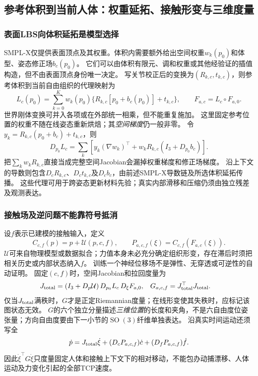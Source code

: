 \documentclass[11pt,a4paper]{article}
\numberwithin{equation}{section}
\theoremstyle{definition}
\DeclareMathOperator{\SO}{SO}
\begin{document}
\subsection{参考体积到当前人体：权重延拓、接触形变与三维度量}
\label{geo:sub:volume-transport}

\subsubsection{表面LBS向体积延拓是模型选择}
SMPL-X仅提供表面顶点及其权重。体积内需要额外给出空间权重$w_k(p_0)$和体型、姿态修正场$b_c(p_0)$。
它们可以由体积有限元、调和权重或其他经验证的插值构造，但不由表面顶点身份唯一决定。
写关节校正后的变换为$(R_{k,c},t_{k,c})$，则参考体积到当前自由组织的代理映射为
\begin{equation}
 L_c(p_0)=\sum_{k=0}^{K}w_k(p_0)
       \{R_{k,c}[p_0+b_c(p_0)]+t_{k,c}\},
 \qquad F_{a,c}=L_c\circ F_{a,0}.
 \label{geo:eq:volume-lbs}
\end{equation}
世界刚体变换可并入各项或在外部统一相乘，但不能重复施加。
这里固定参考位置的权重不随在线姿态重新烘焙；其\emph{空间梯度}仍一般非零。
令$y_k=R_{k,c}(p_0+b_c)+t_{k,c}$，则
\begin{equation}
 D_{p_0}L_c=
 \sum_k\left[y_k(\nabla w_k)^{\top}
           +w_kR_{k,c}(I_3+D_{p_0}b_c)\right].
 \label{geo:eq:volume-lbs-jac}
\end{equation}
把$\sum_kw_kR_{k,c}$直接当成完整空间Jacobian会漏掉权重梯度和修正场梯度。
沿上下文的导数则包含$D_cR_{k,c}$、$D_ct_{k,c}$及$D_cb_c$，由前述SMPL-X导数链及所选体积延拓传播。
这些代理可用于跨姿态更新材料先验；真实内部滑移和压缩仍须由独立残差及观测表达。

\subsubsection{接触场及逆问题不能靠符号抵消}
设$f$表示已建模的接触输入，定义
\begin{equation}
 C_{c,f}(p)=p+\mathcal U(p,c,f),\qquad
 P_{a,c,f}(\xi)=C_{c,f}(F_{a,c}(\xi)).
 \label{geo:eq:contact-map}
\end{equation}
$\mathcal U$可来自物理模型或数据拟合；力值本身未必充分确定组织形变，存在滞后时须把相关历史或内部状态纳入$f$。
训练一个神经位移场不是弹性、无穿透或可逆性的自动证明。
固定$(c,f)$时，空间Jacobian和拉回度量为
\begin{align}
 J_{\rm total}&=(I_3+D_p\mathcal U)\,D_{p_0}L_c\,D_\xi F_{a,0},
 &G_{a,c,f}&=J_{\rm total}^{\top}J_{\rm total}.
 \label{geo:eq:total-metric}
\end{align}
仅当$J_{\rm total}$满秩时，$G$才是正定Riemannian度量；在线形变使其失秩时，应标记该图状态无效。
$G$的六个独立分量描述\emph{三维位置}的长度和夹角，不是六自由度位姿张量；方向自由度要由下一小节的$\SO(3)$纤维单独表达。
沿真实时间运动还须写全
\begin{equation}
 \dot p=J_{\rm total}\dot\xi
           +(D_cP_{a,c,f})\dot c+(D_fP_{a,c,f})\dot f.
 \label{geo:eq:moving-volume-velocity}
\end{equation}
因此$\dot\xi^{\top}G\dot\xi$只度量固定人体和接触上下文下的相对移动，不能包办动捕漂移、人体运动及力变化引起的全部TCP速度。
\end{document}
